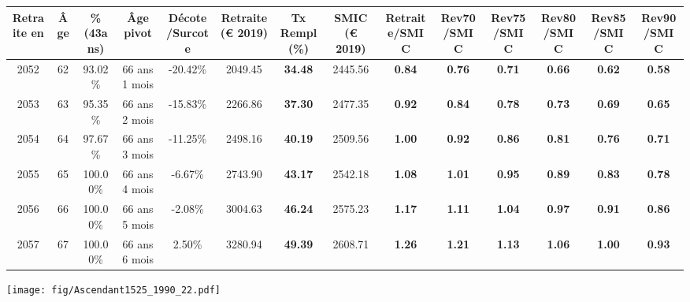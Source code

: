 \begin{adjustbox}{max width=\textwidth} 
\begin{tabular}[htb]{|c|c||c|c|c||c|c||c||c|c|c|c|c|c|} 
\hline 
 Retraite en &  Âge &  \%(43ans) &  Âge pivot &  Décote/Surcote &  Retraite (\euro{} 2019) &  Tx Rempl(\%) &  SMIC (\euro{} 2019) &  Retraite/SMIC &  Rev70/SMIC &  Rev75/SMIC &  Rev80/SMIC &  Rev85/SMIC &  Rev90/SMIC \\ 
\hline \hline 
 2052 &  62 &  93.02\% &  66 ans 1 mois &  -20.42\% &  2049.45 &  {\bf 34.48} &  2445.56 &  {\bf {\color{red} 0.84}} &  {\bf {\color{red} 0.76}} &  {\bf {\color{red} 0.71}} &  {\bf {\color{red} 0.66}} &  {\bf {\color{red} 0.62}} &  {\bf {\color{red} 0.58}} \\ 
\hline 
 2053 &  63 &  95.35\% &  66 ans 2 mois &  -15.83\% &  2266.86 &  {\bf 37.30} &  2477.35 &  {\bf {\color{red} 0.92}} &  {\bf {\color{red} 0.84}} &  {\bf {\color{red} 0.78}} &  {\bf {\color{red} 0.73}} &  {\bf {\color{red} 0.69}} &  {\bf {\color{red} 0.65}} \\ 
\hline 
 2054 &  64 &  97.67\% &  66 ans 3 mois &  -11.25\% &  2498.16 &  {\bf 40.19} &  2509.56 &  {\bf {\color{red} 1.00}} &  {\bf {\color{red} 0.92}} &  {\bf {\color{red} 0.86}} &  {\bf {\color{red} 0.81}} &  {\bf {\color{red} 0.76}} &  {\bf {\color{red} 0.71}} \\ 
\hline 
 2055 &  65 &  100.00\% &  66 ans 4 mois &  -6.67\% &  2743.90 &  {\bf 43.17} &  2542.18 &  {\bf 1.08} &  {\bf 1.01} &  {\bf {\color{red} 0.95}} &  {\bf {\color{red} 0.89}} &  {\bf {\color{red} 0.83}} &  {\bf {\color{red} 0.78}} \\ 
\hline 
 2056 &  66 &  100.00\% &  66 ans 5 mois &  -2.08\% &  3004.63 &  {\bf 46.24} &  2575.23 &  {\bf 1.17} &  {\bf 1.11} &  {\bf 1.04} &  {\bf {\color{red} 0.97}} &  {\bf {\color{red} 0.91}} &  {\bf {\color{red} 0.86}} \\ 
\hline 
 2057 &  67 &  100.00\% &  66 ans 6 mois &  2.50\% &  3280.94 &  {\bf 49.39} &  2608.71 &  {\bf 1.26} &  {\bf 1.21} &  {\bf 1.13} &  {\bf 1.06} &  {\bf {\color{red} 1.00}} &  {\bf {\color{red} 0.93}} \\ 
\hline 
\hline 
\end{tabular} 
\end{adjustbox} 
 
 \vspace{0.1cm} 

 \begin{center}\texttt{[image: fig/Ascendant1525\_1990\_22.pdf]}\end{center} \label{fig/Ascendant1525_1990_22.pdf} 

